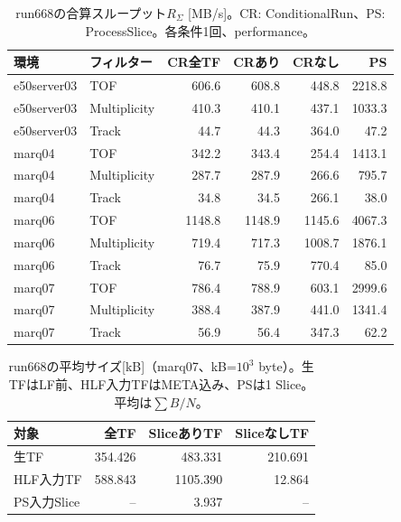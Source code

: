 \begin{table}[H]\centering\small
\caption{run668の合算スループット$R_\Sigma$ [MB/s]。CR: ConditionalRun、PS: ProcessSlice。各条件1回、performance。}
\begin{tabular}{llrrrr}\hline
環境 & フィルター & CR全TF & CRあり & CRなし & PS \\\hline
e50server03 & TOF & 606.6 & 608.8 & 448.8 & 2218.8 \\
e50server03 & Multiplicity & 410.3 & 410.1 & 437.1 & 1033.3 \\
e50server03 & Track & 44.7 & 44.3 & 364.0 & 47.2 \\
marq04 & TOF & 342.2 & 343.4 & 254.4 & 1413.1 \\
marq04 & Multiplicity & 287.7 & 287.9 & 266.6 & 795.7 \\
marq04 & Track & 34.8 & 34.5 & 266.1 & 38.0 \\
marq06 & TOF & 1148.8 & 1148.9 & 1145.6 & 4067.3 \\
marq06 & Multiplicity & 719.4 & 717.3 & 1008.7 & 1876.1 \\
marq06 & Track & 76.7 & 75.9 & 770.4 & 85.0 \\
marq07 & TOF & 786.4 & 788.9 & 603.1 & 2999.6 \\
marq07 & Multiplicity & 388.4 & 387.9 & 441.0 & 1341.4 \\
marq07 & Track & 56.9 & 56.4 & 347.3 & 62.2 \\
\hline\end{tabular}\end{table}
\begin{table}[H]\centering\small
\caption{run668の平均サイズ[kB]（marq07、kB=$10^3$ byte）。生TFはLF前、HLF入力TFはMETA込み、PSは1 Slice。平均は$\sum B/N$。}
\begin{tabular}{lrrr}\hline 対象 & 全TF & SliceありTF & SliceなしTF \\\hline
生TF & 354.426 & 483.331 & 210.691 \\
HLF入力TF & 588.843 & 1105.390 & 12.864 \\
PS入力Slice & -- & 3.937 & -- \\
\hline\end{tabular}\end{table}
